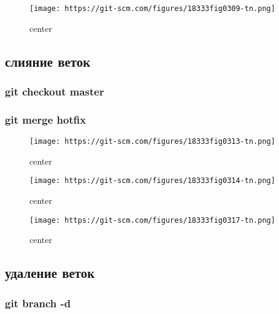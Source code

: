 \documentclass[11pt]{article}
\makeatletter
\def\maxwidth{\ifdim\Gin@nat@width>\linewidth\linewidth
    \else\Gin@nat@width\fi}
\let\Oldincludegraphics\includegraphics
\renewcommand{\includegraphics}[1]{\Oldincludegraphics[width=.8\maxwidth]{#1}}
\makeatother
\begin{document}
    \begin{figure}
\centering
\texttt{[image: https://git-scm.com/figures/18333fig0309-tn.png]}
\caption{center}
\end{figure}

    \hypertarget{ux441ux43bux438ux44fux43dux438ux435-ux432ux435ux442ux43eux43a}{%
\subsection{слияние
веток}\label{ux441ux43bux438ux44fux43dux438ux435-ux432ux435ux442ux43eux43a}}

\hypertarget{git-checkout-master}{%
\subsubsection{git checkout master}\label{git-checkout-master}}

\hypertarget{git-merge-hotfix}{%
\subsubsection{git merge hotfix}\label{git-merge-hotfix}}

    \begin{figure}
\centering
\texttt{[image: https://git-scm.com/figures/18333fig0313-tn.png]}
\caption{center}
\end{figure}

    \begin{figure}
\centering
\texttt{[image: https://git-scm.com/figures/18333fig0314-tn.png]}
\caption{center}
\end{figure}

    \begin{figure}
\centering
\texttt{[image: https://git-scm.com/figures/18333fig0317-tn.png]}
\caption{center}
\end{figure}

    \hypertarget{ux443ux434ux430ux43bux435ux43dux438ux435-ux432ux435ux442ux43eux43a}{%
\subsection{удаление
веток}\label{ux443ux434ux430ux43bux435ux43dux438ux435-ux432ux435ux442ux43eux43a}}

\hypertarget{git-branch--d}{%
\subsubsection{git branch -d}\label{git-branch--d}}
\end{document}
